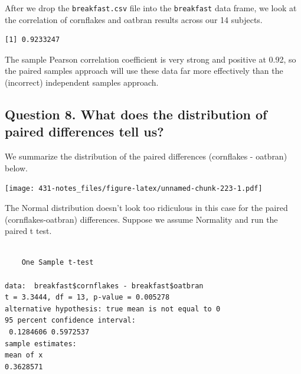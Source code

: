 \documentclass[
]{book}
\newenvironment{Shaded}{\begin{snugshade}}{\end{snugshade}}
\newcommand{\KeywordTok}[1]{\textcolor[rgb]{0.13,0.29,0.53}{\textbf{#1}}}
\newcommand{\NormalTok}[1]{#1}
\newcommand{\OperatorTok}[1]{\textcolor[rgb]{0.81,0.36,0.00}{\textbf{#1}}}
\newcommand{\StringTok}[1]{\textcolor[rgb]{0.31,0.60,0.02}{#1}}
\begin{document}
After we drop the \texttt{breakfast.csv} file into the \texttt{breakfast} data frame, we look at the correlation of cornflakes and oatbran results across our 14 subjects.

\begin{Shaded}
\end{Shaded}

\begin{verbatim}
[1] 0.9233247
\end{verbatim}

The sample Pearson correlation coefficient is very strong and positive at 0.92, so the paired samples approach will use these data far more effectively than the (incorrect) independent samples approach.

\hypertarget{question-8.-what-does-the-distribution-of-paired-differences-tell-us}{%
\subsection{Question 8. What does the distribution of paired differences tell us?}\label{question-8.-what-does-the-distribution-of-paired-differences-tell-us}}

We summarize the distribution of the paired differences (cornflakes - oatbran) below.

\texttt{[image: 431-notes\_files/figure-latex/unnamed-chunk-223-1.pdf]}

The Normal distribution doesn't look too ridiculous in this case for the paired (cornflakes-oatbran) differences. Suppose we assume Normality and run the paired t test.

\begin{Shaded}
\end{Shaded}

\begin{verbatim}

	One Sample t-test

data:  breakfast$cornflakes - breakfast$oatbran
t = 3.3444, df = 13, p-value = 0.005278
alternative hypothesis: true mean is not equal to 0
95 percent confidence interval:
 0.1284606 0.5972537
sample estimates:
mean of x 
0.3628571 
\end{verbatim}
\end{document}
